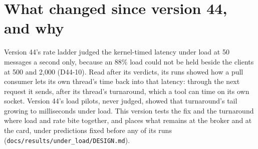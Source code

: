\documentclass[11pt]{article}
\begin{document}
\section*{What changed since version 44, and why}
Version 44's rate ladder judged the kernel-timed latency under load at 50 messages a second only,
because an 88\% load could not be held beside the clients at 500 and 2,000 (D44-10). Read after
its verdicts, its runs showed how a pull consumer lets its own thread's time back into that
latency: through the next request it sends, after its thread's turnaround, which a tool can time
on its own socket. Version 44's load pilots, never judged, showed that turnaround's tail growing to
milliseconds under load. This version tests the fix and the turnaround where load and rate bite
together, and places what remains at the broker and at the card, under predictions fixed before
any of its runs (\texttt{docs/results/under\_load/DESIGN.md}).
\end{document}
